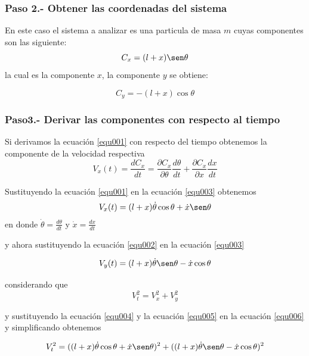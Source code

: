 \documentclass[12pt]{book}
\theoremstyle{definition}
\theoremstyle{remark}
\theoremstyle{plain}
\begin{document}
\subsubsection{Paso 2.- Obtener las coordenadas del sistema }
En este caso el sistema a analizar es una particula de masa $m$  cuyas componentes son las siguiente:
\begin{equation}
\label{equ001}
C_x = (l+x) \sen \theta
\end{equation}
la cual es la componente $x$, la componente $y$ se obtiene:

\begin{equation}
\label{equ002}
C_y = - (l+x) \cos \theta
\end{equation}

\subsubsection{Paso3.-  Derivar las componentes con respecto al tiempo}

Si derivamos la ecuación \ref{equ001} con respecto del tiempo obtenemos la componente de la velocidad respectiva
\begin{equation}
\label{equ003}
V_x (t)= \frac{d C_x}{d t} = \frac{\partial C_x}{\partial \theta} \frac{d \theta}{d t}+ \frac{\partial C_x}{\partial x} \frac{d x}{d t}
\end{equation}

Sustituyendo la ecuación \ref{equ001}  en la ecuación \ref{equ003} obtenemos
\begin{equation}
\label{equ004}
V_x (t)= (l+x) \dot{\theta} \cos \theta+ \dot{x} \sen \theta 
\end{equation}  
en donde $\dot{\theta}=\frac{d \theta}{d t}$ y $\dot{x}=\frac{d x}{d t}$

y ahora sustituyendo  la ecuación \ref{equ002}  en la ecuación \ref{equ003} 

\begin{equation}
\label{equ005}
V_y (t)= (l+x) \dot{\theta} \sen \theta-  \dot{x} \cos \theta 
\end{equation}  

considerando que 
\begin{equation}
\label{equ006}
V_t ^2 = V_x ^2 + V_y ^2
\end{equation}

y sustituyendo la ecuación \ref{equ004} y la ecuación \ref{equ005} en la ecuación \ref{equ006} y simplificando obtenemos

\begin{equation*}
V_t ^2 = ( (l+x) \dot{\theta} \cos \theta+ \dot{x} \sen \theta  ) ^2 + ( (l+x) \dot{\theta} \sen \theta-  \dot{x} \cos \theta ) ^2
\end{equation*}
\end{document}
